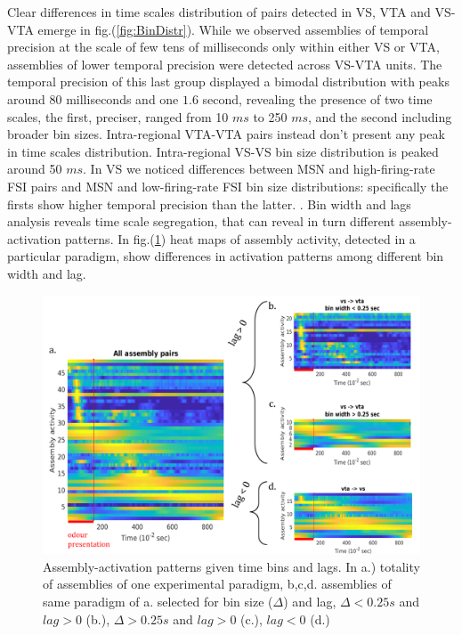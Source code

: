 Clear differences in time scales distribution of pairs detected in VS, VTA and VS-VTA emerge in fig.(\ref{fig:BinDistr}). While we observed assemblies of temporal precision at the scale of few tens of milliseconds only within either VS or VTA, assemblies of lower temporal precision were detected across VS-VTA units. The temporal precision of this last group displayed a bimodal distribution with peaks around $80$ milliseconds and one $1.6$ second, revealing the presence of two time scales, the first, preciser, ranged from 10 $ms$ to 250 $ms$, and the second including broader bin sizes. Intra-regional VTA-VTA pairs instead don't present any peak in time scales distribution. Intra-regional VS-VS bin size distribution is peaked around 50 $ms$. In VS we noticed differences between MSN and high-firing-rate FSI pairs and MSN and low-firing-rate FSI bin size distributions: specifically the firsts show higher temporal precision than the latter. {\color{red}{Include Figure of MSN-FSI and caption of bin size distribution}}.
Bin width and lags analysis reveals time scale segregation, that can reveal in turn different assembly-activation patterns. In fig.(\ref{fig:AsActBinLag}) heat maps of assembly activity, detected in a particular paradigm, show differences in activation patterns among different bin width and lag. %
\begin{figure}
    \centering
    \includegraphics[scale=0.45]{figures/AsActPerBinLag1.png}
    \caption{Assembly-activation patterns given time bins and lags. In a.) totality of assemblies of one experimental paradigm, b,c,d. assemblies of same paradigm of a. selected for bin size ($\Delta$) and lag, $\Delta < 0.25 s$ and $lag > 0$ (b.), $\Delta > 0.25 s$ and $lag > 0$ (c.), $lag < 0$ (d.)}
    \label{fig:AsActBinLag}
\end{figure}
